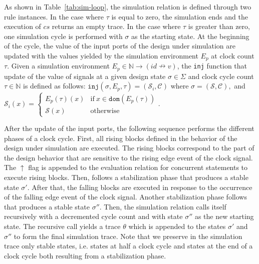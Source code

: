 \documentclass[pdflatex,sn-mathphys]{sn-jnl}%
\theoremstyle{thmstyleone}%
\theoremstyle{thmstyletwo}%
\theoremstyle{thmstylethree}%
\begin{document}
As shown in Table~\ref{tab:sim-loop}, the \hvhdl{} simulation relation
is defined through two rule instances.  In the case where $\tau$ is
equal to zero, the simulation ends and the execution of $cs$ returns
an empty trace. In the case where $\tau$ is greater than zero, one
simulation cycle is performed with $\sigma$ as the starting state. At
the beginning of the cycle, the value of the input ports of the design
under simulation are updated with the values yielded by the simulation
environment $E_p$ at clock count $\tau$. Given a simulation
environment $E_p\in\mathbb{N}\rightarrow(id\nrightarrow{}v)$, the
\texttt{inj} function that update of the value of signals at a given
design state $\sigma\in\Sigma$ and clock cycle count
$\tau\in{}\mathbb{N}$ is defined as follows:
$\mathtt{inj}(\sigma,E_p,\tau)=(\mathcal{S}_i,\mathcal{C})$ where
$\sigma=(\mathcal{S},\mathcal{C}), $ and $\mathcal{S}_i(x)=
\begin{cases}
  E_p(\tau)(x) & \mathrm{if}~x\in\mathtt{dom}(E_p(\tau)) \\
  \mathcal{S}(x) & \mathrm{otherwise}
\end{cases}$.

After the update of the input ports, the following sequence performs
the different phases of a clock cycle. First, all rising blocks
defined in the behavior of the design under simulation are
executed. The rising blocks correspond to the part of the design
behavior that are sensitive to the rising edge event of the clock
signal. %
The $\uparrow$ flag is appended to the evaluation relation for
concurrent statements to execute rising blocks. Then, follows a
stabilization phase that produces a stable state $\sigma'$. After
that, the falling blocks are executed in response to the occurrence of
the falling edge event of the clock signal. Another stabilization
phase follows that produces a stable state $\sigma''$.  Then, the
\hvhdl{} simulation relation calls itself recursively with a
decremented cycle count and with state $\sigma''$ as the new starting
state. The recursive call yields a trace $\theta$ which is appended to
the states $\sigma'$ and $\sigma''$ to form the final simulation
trace. Note that we preserve in the simulation trace only stable
states, i.e. states at half a clock cycle and states at the end of a
clock cycle both resulting from a stabilization phase.
\end{document}
